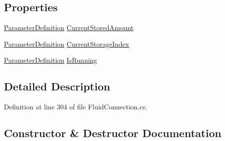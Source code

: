 \subsection*{Properties}
\begin{DoxyCompactItemize}
\item 
\hyperlink{class_project_porcupine_1_1_buildable_1_1_components_1_1_buildable_component_1_1_parameter_definition}{Parameter\+Definition} \hyperlink{class_project_porcupine_1_1_buildable_1_1_components_1_1_fluid_connection_1_1_fluid_connection_parameter_definitions_a85204b5ea50275b26ddebd2d0e95f64c}{Current\+Stored\+Amount}
\item 
\hyperlink{class_project_porcupine_1_1_buildable_1_1_components_1_1_buildable_component_1_1_parameter_definition}{Parameter\+Definition} \hyperlink{class_project_porcupine_1_1_buildable_1_1_components_1_1_fluid_connection_1_1_fluid_connection_parameter_definitions_ac2b8407be08d67bc0650e9f269457d82}{Current\+Storage\+Index}
\item 
\hyperlink{class_project_porcupine_1_1_buildable_1_1_components_1_1_buildable_component_1_1_parameter_definition}{Parameter\+Definition} \hyperlink{class_project_porcupine_1_1_buildable_1_1_components_1_1_fluid_connection_1_1_fluid_connection_parameter_definitions_a1a45b39072698016e34c01f22fc42845}{Is\+Running}
\end{DoxyCompactItemize}


\subsection{Detailed Description}


Definition at line 304 of file Fluid\+Connection.\+cs.



\subsection{Constructor \& Destructor Documentation}
\mbox{\label{class_project_porcupine_1_1_buildable_1_1_components_1_1_fluid_connection_1_1_fluid_connection_parameter_definitions_a2e01c623157230239cd33ea6d7ba306a}} 
